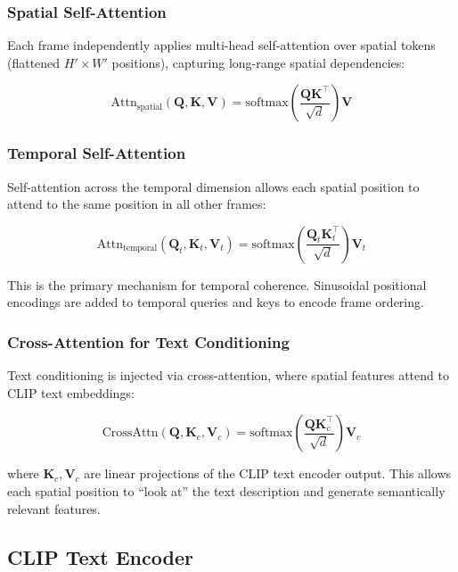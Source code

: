 \documentclass[conference]{IEEEtran}
\begin{document}
\subsubsection{Spatial Self-Attention}
Each frame independently applies multi-head self-attention over spatial tokens (flattened $H' \times W'$ positions), capturing long-range spatial dependencies:

\begin{equation}
    \text{Attn}_{\text{spatial}}(\mathbf{Q}, \mathbf{K}, \mathbf{V}) = \text{softmax}\left(\frac{\mathbf{Q}\mathbf{K}^\top}{\sqrt{d}}\right)\mathbf{V}
\end{equation}

\subsubsection{Temporal Self-Attention}
Self-attention across the temporal dimension allows each spatial position to attend to the same position in all other frames:

\begin{equation}
    \text{Attn}_{\text{temporal}}(\mathbf{Q}_t, \mathbf{K}_t, \mathbf{V}_t) = \text{softmax}\left(\frac{\mathbf{Q}_t\mathbf{K}_t^\top}{\sqrt{d}}\right)\mathbf{V}_t
\end{equation}

This is the primary mechanism for temporal coherence. Sinusoidal positional encodings are added to temporal queries and keys to encode frame ordering.

\subsubsection{Cross-Attention for Text Conditioning}
Text conditioning is injected via cross-attention, where spatial features attend to CLIP text embeddings:

\begin{equation}
    \text{CrossAttn}(\mathbf{Q}, \mathbf{K}_c, \mathbf{V}_c) = \text{softmax}\left(\frac{\mathbf{Q}\mathbf{K}_c^\top}{\sqrt{d}}\right)\mathbf{V}_c
\end{equation}

where $\mathbf{K}_c, \mathbf{V}_c$ are linear projections of the CLIP text encoder output. This allows each spatial position to ``look at'' the text description and generate semantically relevant features.

\subsection{CLIP Text Encoder}
\end{document}
